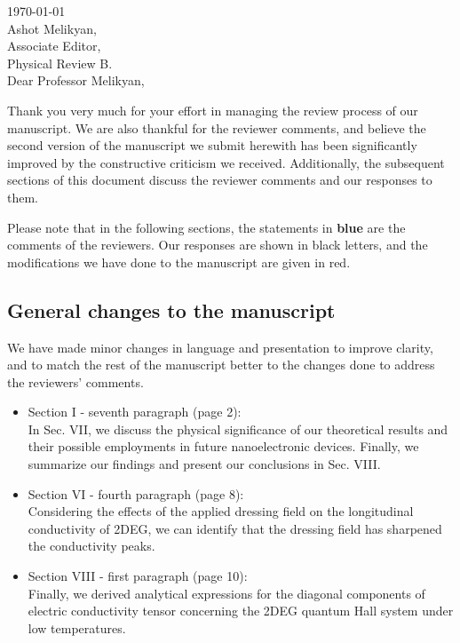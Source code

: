 \documentclass{article}
\begin{document}

\today\\

Ashot Melikyan,\\
Associate Editor,\\
Physical Review B.\\

Dear Professor Melikyan,

Thank you very much for your effort in managing the review process of our manuscript. We are also thankful for the reviewer comments, and believe the second version of the manuscript we submit herewith has been significantly improved by the constructive criticism we received. Additionally, the subsequent sections of this document discuss the reviewer comments and our responses to them.

Please note that in the following sections, the statements in {\color{RoyalBlue} \textbf{blue}} are the comments of the reviewers. Our responses are shown in black letters, and the modifications we have done to the manuscript are given in {\color{Red} red}.

\subsection*{General changes to the manuscript}


We have made minor changes in language and presentation to improve clarity, and to match the rest of the manuscript better to the changes done to address the reviewers' comments.
\begin{itemize}
    \item Section I - seventh paragraph (page 2): \\
        {\color{Red} In Sec. VII, we discuss the physical significance of our theoretical results and their possible employments in future nanoelectronic devices.
        Finally, we summarize our findings and present our conclusions in Sec. VIII.}
    \item Section VI - fourth paragraph (page 8): \\
        {\color{Red} Considering the effects of the applied dressing field on the longitudinal conductivity of 2DEG, we can identify that the dressing field has sharpened the conductivity peaks.}
    \item Section VIII - first paragraph (page 10): \\
        {\color{Red} Finally, we derived analytical expressions for the diagonal components of electric conductivity tensor concerning the 2DEG quantum Hall system under low temperatures.}
\end{itemize}
\end{document}
